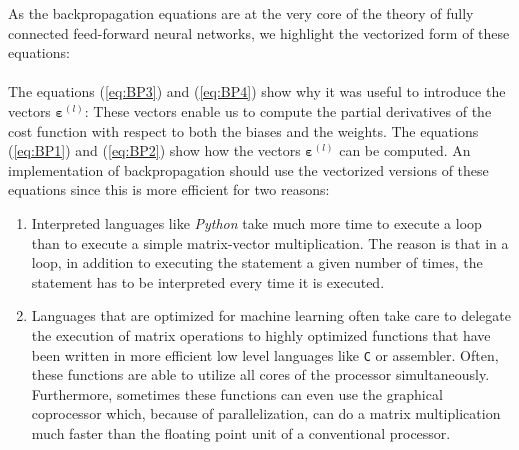 As the backpropagation equations  are at the very core of the theory of
fully connected feed-forward neural networks, we highlight the vectorized form of these equations:
\\[0.2cm]
\hspace*{0.3cm}
\\[0.2cm]
The equations (\ref{eq:BP3}) and (\ref{eq:BP4}) show why it was useful to introduce the
vectors $\boldsymbol{\varepsilon}^{(l)}$: These vectors enable us to compute the partial derivatives of the cost function
with respect to both the biases and the weights.  The equations (\ref{eq:BP1}) and (\ref{eq:BP2})
show how the vectors $\boldsymbol{\varepsilon}^{(l)}$ can be computed.  An implementation of backpropagation should use the vectorized
versions of these equations since this is more efficient for two reasons:
\begin{enumerate}
\item Interpreted languages like \textsl{Python} take much more time to
      execute a loop than to execute a simple matrix-vector multiplication.  The reason is that in a loop, in
      addition to executing the statement a given number of times, the statement has to be interpreted 
      every time it is executed.
\item Languages that are optimized for machine learning often take care to delegate the execution of matrix
      operations to highly optimized functions that have been written in more efficient low level languages like
      \texttt{C} or assembler.  Often, these functions are able to utilize all cores of the processor
      simultaneously.  Furthermore, sometimes these functions can even use the graphical coprocessor
      which, because of parallelization, can do a matrix multiplication much faster than the floating point unit of
      a conventional processor.
\end{enumerate}

